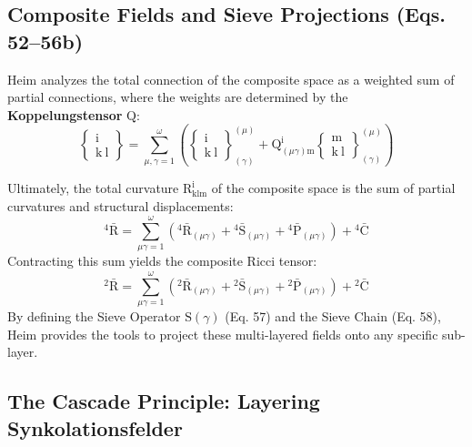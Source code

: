 \documentclass[12pt]{article}
\begin{document}
\subsection{Composite Fields and Sieve Projections (Eqs. 52--56b)}
\label{sec:field_composite_projections}

Heim analyzes the total connection of the composite space as a weighted sum of partial connections, where the weights are determined by the \textbf{Koppelungstensor} $\mathrm{Q}$:
\begin{equation}
\left\{ \begin{smallmatrix} \mathrm{i} \\ \mathrm{k} \ \mathrm{l} \end{smallmatrix} \right\} = \sum_{\mu,\gamma=1}^\omega \left( \left\{ \begin{smallmatrix} \mathrm{i} \\ \mathrm{k} \ \mathrm{l} \end{smallmatrix} \right\}^{(\mu)}_{(\gamma)} + \mathrm{Q}^\mathrm{i}_{(\mu\gamma)\mathrm{m}} \left\{ \begin{smallmatrix} \mathrm{m} \\ \mathrm{k} \ \mathrm{l} \end{smallmatrix} \right\}^{(\mu)}_{(\gamma)} \right) \tag{53}
\end{equation}

Ultimately, the total curvature $\mathrm{R}^\mathrm{i}_{\mathrm{klm}}$ of the composite space is the sum of partial curvatures and structural displacements:
\begin{equation}
{}^4\bar{\mathrm{R}} = \sum_{\mu\gamma=1}^{\omega} \left( {}^4\bar{\mathrm{R}}_{(\mu\gamma)} + {}^4\bar{\mathrm{S}}_{(\mu\gamma)} + {}^4\bar{\mathrm{P}}_{(\mu\gamma)} \right) + {}^4\bar{\mathrm{C}} \tag{55}
\end{equation}
Contracting this sum yields the composite Ricci tensor:
\begin{equation}
{}^2\bar{\mathrm{R}} = \sum_{\mu\gamma=1}^{\omega} \left( {}^2\bar{\mathrm{R}}_{(\mu\gamma)} + {}^2\bar{\mathrm{S}}_{(\mu\gamma)} + {}^2\bar{\mathrm{P}}_{(\mu\gamma)} \right) + {}^2\bar{\mathrm{C}} \tag{56}
\end{equation}
By defining the Sieve Operator $\mathrm{S}(\gamma)$ (Eq. 57) and the Sieve Chain (Eq. 58), Heim provides the tools to project these multi-layered fields onto any specific sub-layer.

\subsection{The Cascade Principle: Layering Synkolationsfelder}
\label{sec:cascade_principle_original}
\end{document}
